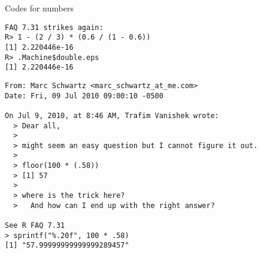 \begin{vbframe}{Codes for numbers}
\begin{verbatim}
FAQ 7.31 strikes again:
R> 1 - (2 / 3) * (0.6 / (1 - 0.6))
[1] 2.220446e-16
R> .Machine$double.eps
[1] 2.220446e-16
\end{verbatim}

\framebreak
\vspace*{-0.5cm}
\begin{verbatim}
From: Marc Schwartz <marc_schwartz_at_me.com>
Date: Fri, 09 Jul 2010 09:00:10 -0500

On Jul 9, 2010, at 8:46 AM, Trafim Vanishek wrote:
  > Dear all,
  >
  > might seem an easy question but I cannot figure it out.
  >
  > floor(100 * (.58))
  > [1] 57
  >
  > where is the trick here?
  >   And how can I end up with the right answer?

See R FAQ 7.31
> sprintf("%.20f", 100 * .58)
[1] "57.99999999999999289457"
\end{verbatim}
\end{vbframe}


\endlecture



